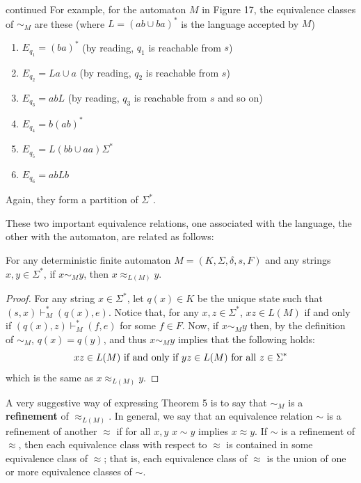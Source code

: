 \setcounter{example}{9}
\begin{example}{ continued}
  For example, for the automaton $M$ in Figure 17, the equivalence classes of $\sim_M$ are these (where $L = (ab \cup ba)^*$ is the language accepted by $M$)
  \begin{enumerate}
    \item $E_{q_1} = (ba)^*$ (by reading, $q_1$ is reachable from $s$)
    \item $E_{q_2} = La \cup a$ (by reading, $q_2$ is reachable from $s$)
    \item $E_{q_3} = abL$ (by reading, $q_3$ is reachable from $s$ and so on)
    \item $E_{q_4} = b (ab)^*$
    \item $E_{q_5} = L(bb \cup aa)\Sigma^*$
    \item $E_{q_6} = abLb$
  \end{enumerate}
  Again, they form a partition of $\Sigma^*$.
\end{example}

These two important equivalence relations, one associated with the language, the other with the automaton, are related as follows:

\begin{theorem}{}
  For any deterministic finite automaton $M = \left( K, \Sigma, \delta, s, F \right)$ and any strings $x, y \in \Sigma^*$, if $x \sim_M y$, then $x \approx_{L(M)} y$.   
\end{theorem}

\begin{proof}
  For any string $x \in \Sigma^*$, let $q(x) \in K$ be the unique state such that $(s, x) \vdash_M^* (q(x), e)$. Notice that, for any $x,z \in \Sigma^*$, $xz \in L(M)$ if and only if $(q(x), z) \vdash_M^* (f,e)$ for some $f \in F$. Now, if $x \sim_M y$ then, by the definition of $\sim_M$, $q(x) = q(y)$, and thus $x \sim_M y$ implies that the following holds:
  \begin{equation*}
    xz \in L(M) \textnormal{ if and only if } yz \in L(M) \textnormal{ for all } z \in \Sigma^*
  \end{equation*}
  which is the same as $x \approx_{L(M)} y$.
\end{proof}

A very suggestive way of expressing Theorem 5 is to say that $\sim_M$ is
a \textbf{refinement} of $\approx_{L(M)}$. In general, we say that an equivalence relation $\sim$ is a refinement of another $\approx$ if for all $x, y$ $x \sim y$ implies $x \approx y$. If $\sim$ is a refinement of $\approx$, then each equivalence class with respect to $\approx$ is contained in some equivalence class of $\approx$; that is, each equivalence class of $\approx$ is the union of one or more equivalence classes of $\sim$.

